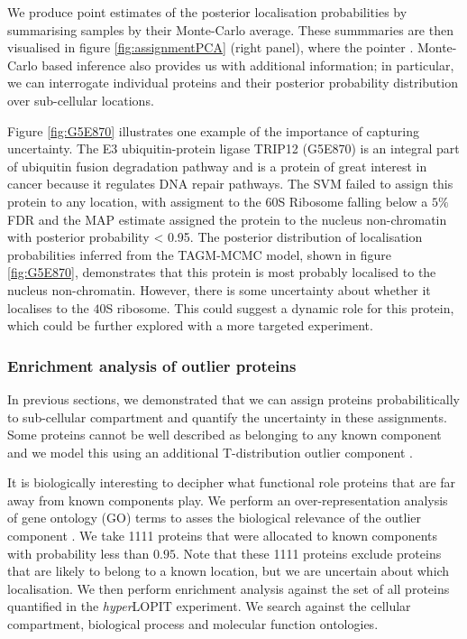 \documentclass[10pt,letterpaper]{article}\usepackage[]{graphicx}\usepackage[]{color}
\begin{document}
We produce point estimates of the posterior localisation probabilities
by summarising samples by their Monte-Carlo average.  These summmaries
are then visualised in figure \ref{fig:assignmentPCA} (right panel),
where the pointer {\color{black}{is scaled according to the localisation
probabilities of the sub-cellular niche with the largest posterior
probability}}. Monte-Carlo based inference also provides us with
additional information; in particular, we can interrogate individual
proteins and their posterior probability distribution over
sub-cellular locations.

Figure \ref{fig:G5E870} illustrates one example of the importance of
capturing uncertainty.  The E3 ubiquitin-protein ligase TRIP12
(G5E870) is an integral part of ubiquitin fusion degradation pathway
and is a protein of great interest in cancer because it regulates DNA
repair pathways. The SVM failed to assign this protein to any
location, with assigment to the 60S Ribosome falling below a $5\%$ FDR
and the MAP estimate assigned the protein to the nucleus non-chromatin
with posterior probability < 0.95.  The posterior distribution of
localisation probabilities inferred from the TAGM-MCMC model, shown in
figure \ref{fig:G5E870}, demonstrates that this protein is most
probably localised to the nucleus non-chromatin. However, there is
some uncertainty about whether it localises to the $40$S ribosome.
This could suggest a dynamic role for this protein, which could be
further explored with a more targeted experiment.



\subsubsection*{Enrichment analysis of outlier proteins}

In previous sections, we demonstrated that we can assign proteins
probabilitically to sub-cellular compartment and quantify the
uncertainty in these assignments. Some proteins cannot be well
described as belonging to any known component and we model this
using an additional T-distribution outlier component
{}.

It is biologically interesting to decipher what functional role
proteins that are far away from known components play. We perform an
over-representation analysis of gene ontology (GO) terms to asses the
biological relevance of the outlier component \cite{Boyle:2004,
  Yu:2012}. We take 1111 proteins that were allocated to known
components with probability less than $0.95$.  Note that these 1111
proteins exclude proteins that are likely to belong to a known
location, but we are uncertain about which localisation.  We then
perform enrichment analysis against the set of all proteins
quantified in the \textit{hyper}LOPIT experiment. We search against
the cellular compartment, biological process and molecular function
ontologies.
\end{document}
